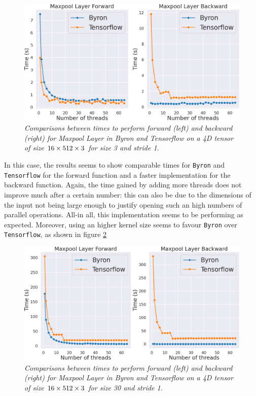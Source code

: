 \documentclass[12pt,a4paper]{report}
\begin{document}
\begin{figure}[H]
\centering
\includegraphics[scale=0.29]{./images/maxpool_timing_3.png}
\caption{\it Comparisons between times to perform forward (left) and backward (right) for Maxpool Layer in Byron and Tensorflow on a 4D tensor of size $16 \time 512 \times 512 \times 3$ for size 3 and stride 1.}
\label{fig:time-max-3}
\end{figure}

In this case, the results seems to show comparable times for {\tt Byron} and {\tt Tensorflow} for the forward function and a faster implementation for the backward function.
Again, the time gained by adding more threads does not improve much after a certain number: this can also be due to the dimensions of the input not being large enough to justify opening such an high numbers of parallel operations. 
All-in all, this implementation seems to be performing as expected.
Moreover, using an higher kernel size seems to favour {\tt Byron} over {\tt Tensorflow}, as shown in figure \ref{fig:time-max-30}

\begin{figure}[H]
\centering
\includegraphics[scale=0.29]{./images/maxpool_timing_30.png}
\caption{\it Comparisons between times to perform forward (left) and backward (right) for Maxpool Layer in Byron and Tensorflow on a 4D tensor of size $16 \time 512 \times 512 \times 3$ for size 30 and stride 1.}
\label{fig:time-max-30}
\end{figure}
\end{document}
